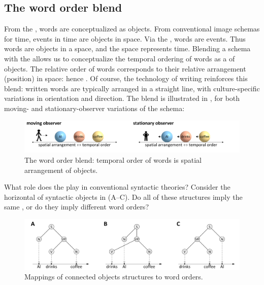 \subsection{The word order blend}

From the , words are conceptualized as objects. From conventional image schemas for time, events in time are objects in space. Via the , words are events. Thus words are objects in a space, and the space represents time. Blending a  schema with the  allows us to conceptualize the temporal ordering of words as a  of objects. The relative order of words corresponds to their relative arrangement (position) in space: hence {}. Of course, the technology of writing reinforces this blend: written words are typically arranged in a straight line, with culture-specific variations in orientation and direction. The blend is illustrated in {}, for both moving- and stationary-observer variations of the schema:

  
\begin{figure}
\includegraphics[width=\textwidth]{figures/Tilsen-img39.png}
\caption{The word order blend: temporal order of words is spatial arrangement of objects.}
\label{fig:3:11}
\end{figure}
 

  What role does the  play in conventional syntactic theories? Consider the horizontal  of syntactic objects in {}(A--C). Do all of these structures imply the same , or do they imply different word orders?

  
\begin{figure}
\includegraphics[width=\textwidth]{figures/Tilsen-img40.png}
\caption{Mappings of connected objects structures to word orders.}
\label{fig:3:12}
\end{figure}
 

